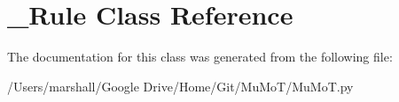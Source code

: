 \hypertarget{class_mu_mo_t_1_1___rule}{}\section{\+\_\+\+Rule Class Reference}
\label{class_mu_mo_t_1_1___rule}


The documentation for this class was generated from the following file\+:\begin{DoxyCompactItemize}
\item 
/\+Users/marshall/\+Google Drive/\+Home/\+Git/\+Mu\+Mo\+T/Mu\+Mo\+T.\+py\end{DoxyCompactItemize}
